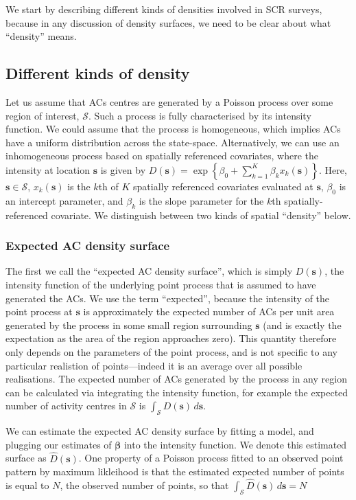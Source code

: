 \documentclass[useAMS,usenatbib,referee]{biom}
\begin{document}
We start by describing different kinds of densities involved in SCR surveys, because in any discussion of density surfaces, we need to be clear about what ``density'' means. 

\subsection{Different kinds of density}\label{different-densities}

Let us assume that ACs centres are generated by a Poisson process over some region of interest, $\mathcal{S}$. Such a process is fully characterised by its intensity function. We could assume that the process is homogeneous, which implies ACs have a uniform distribution across the state-space. Alternatively, we can use an inhomogeneous process based on spatially referenced covariates, where the intensity at location $\bm{s}$ is given by $D(\bm{s})=\exp\left\{\beta_0 + \sum_{k=1}^K\beta_kx_k(\bm{s})\right\}$. Here, $\bm{s} \in \mathcal{S}$, $x_k(\bm{s})$ is the $k$th of $K$ spatially referenced covariates evaluated at $\bm{s}$, $\beta_0$ is an intercept parameter, and $\beta_k$ is the slope parameter for the $k$th spatially-referenced covariate. We distinguish between two kinds of spatial ``density'' below.

\subsubsection{Expected AC density surface} \label{s:eacd}

The first we call the ``expected AC density surface'', which is simply $D(\bm{s})$, the intensity function of the underlying point process that is assumed to have generated the ACs. We use the term ``expected'', because the intensity of the point process at $\bm{s}$ is approximately the expected number of ACs per unit area generated by the process in some small region surrounding $\bm{s}$ (and is exactly the expectation as the area of the region approaches zero). This quantity therefore only depends on the parameters of the point process, and is not specific to any particular realistion of points---indeed it is an average over all possible realisations. The expected number of ACs generated by the process in any region can be calculated via integrating the intensity function, for example the expected number of activity centres in $\mathcal{S}$ is $\int_{\mathcal{S}} D(\bm{s}) \, d\bm{s}$.

We can estimate the expected AC density surface by fitting a model,
and plugging our estimates of $\bm{\beta}$ into the intensity
function. We denote this estimated surface as
$\widehat{D}(\bm{s})$. One property of a Poisson process fitted to
an observed point pattern by maximum likleihood is that the estimated expected number of
points is equal to $N$, the observed number of points, so that
$\int_{\mathcal{S}} \widehat{D}(\bm{s}) \, d\bm{s} = N$
\end{document}
